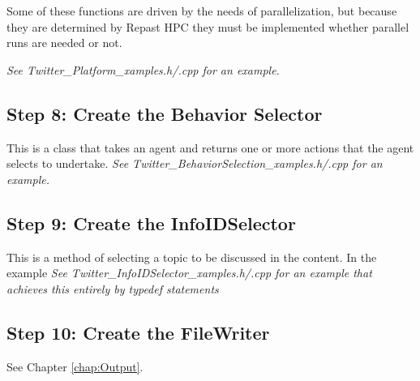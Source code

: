 Some of these functions are driven by the needs of parallelization, but  because they are determined by Repast HPC they must be implemented whether parallel runs are needed or not.

\textit{See Twitter\_Platform\_xamples.h/.cpp for an example.}

\subsection{Step 8: Create the Behavior Selector}
This is a class that takes an agent and returns one or more actions that the agent selects to undertake. \textit{See Twitter\_BehaviorSelection\_xamples.h/.cpp for an example.}

\subsection{Step 9: Create the InfoIDSelector}
This is a method of selecting a topic to be discussed in the content. In the example \textit{See Twitter\_InfoIDSelector\_xamples.h/.cpp for an example that achieves this entirely by typedef statements}

\subsection{Step 10: Create the FileWriter}
See Chapter \ref{chap:Output}.
